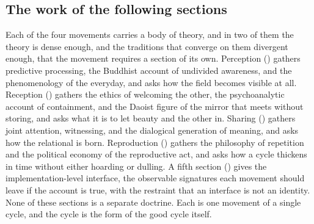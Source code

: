 \subsection{The work of the following sections}
\label{p22:sub:four-roadmap}

Each of the four movements carries a body of theory, and in two of them the theory is dense enough, and the traditions that converge on them divergent enough, that the movement requires a section of its own. Perception () gathers predictive processing, the Buddhist account of undivided awareness, and the phenomenology of the everyday, and asks how the field becomes visible at all. Reception () gathers the ethics of welcoming the other, the psychoanalytic account of containment, and the Daoist figure of the mirror that meets without storing, and asks what it is to let beauty and the other in. Sharing () gathers joint attention, witnessing, and the dialogical generation of meaning, and asks how the relational is born. Reproduction () gathers the philosophy of repetition and the political economy of the reproductive act, and asks how a cycle thickens in time without either hoarding or dulling. A fifth section () gives the implementation-level interface, the observable signatures each movement should leave if the account is true, with the restraint that an interface is not an identity. None of these sections is a separate doctrine. Each is one movement of a single cycle, and the cycle is the form of the good cycle itself.
